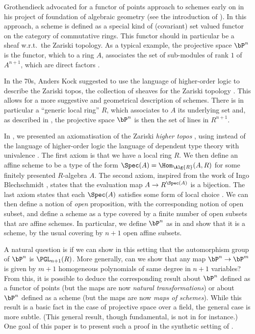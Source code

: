 Grothendieck advocated for a functor of points approach to schemes early on in his
project of foundation of algebraic geometry (see the introduction of \cite{EGAI}).
In this approach, a scheme is defined as a special kind of (covariant) set valued functor
on the category of commutative rings. This functor should in particular
be a sheaf w.r.t.\ the Zariski topology. As a typical example, the projective space $\bP^n$
is the functor, which to a ring $A$,
associates the set of sub-modules of  rank $1$ of $A^{n+1}$, which are direct factors \cite{Demazure,Eisenbud,Jantzen}.

In the 70s, Anders Kock suggested to use the language of higher-order logic \cite{Church40}
to describe the Zariski topos, the collection of sheaves for the Zariski topology \cite{Kock74,kockreyes}.
This allows for
a more suggestive and geometrical description of schemes.
There is in particular a ``generic
local ring'' $R$, which associates to $A$ its underlying set and, as described in \cite{kockreyes},
the projective space $\bP^n$ is then the set of lines in $R^{n+1}$.

In \cite{draft}, we presented an axiomatisation of the Zariski {\em higher topos} \cite{lurie-htt},
using instead of the language of higher-order logic the language of dependent type theory
with univalence \cite{hott}. The first axiom is that we have a local ring $R$. We then define
an affine scheme to be a type of the form $\Spec(A) = \Hom_{\Alg{R}}(A,R)$ for some finitely presented
$R$-algebra $A$. The second axiom, inspired from the work of Ingo Blechschmidt \cite{ingo-thesis},
states that the evaluation map $A\rightarrow R^{\Spec(A)}$ is a bijection. The last axiom states
that each $\Spec(A)$ satisfies some form of local choice \cite{draft}. We can then define a notion
of {\em open} proposition, with the corresponding notion of open subset, and define a scheme as a type
covered by a finite number of open subsets that are affine schemes. In particular, we define
$\bP^n$ as in \cite{kockreyes} and show that it is a scheme, by the usual covering by $n+1$
open affine subsets.%

A natural question is if we can show in this setting that the automorphism group of $\bP^n$
is  $\PGL_{n+1}(R)$.
More generally, can we show that any map $\bP^n\rightarrow \bP^m$ is given by $m+1$ homogeneous
polynomials of same degree in $n+1$ variables?
From this, it is possible to deduce the corresponding result about $\bP^n$ defined as
a functor of points (but the maps are now {\em natural transformations}) or about $\bP^n$ defined
as a scheme (but the maps are now {\em maps of schemes}).
While this result is a basic fact in the case of projective space over a field, the general
case is more subtle.
(This general result, though fundamental, is not in \cite{Hartshorne} for instance.)
One goal of this paper is to present such a proof in the synthetic setting of \cite{draft}.


